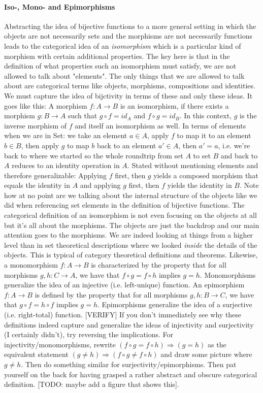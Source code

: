 \paragraph{Iso-, Mono- and Epimorphisms}
Abstracting the idea of bijective functions to a more general setting in which the objects are not necessarily sets and the morphisms are not necessarily functions leads to the categorical idea of an \emph{isomorphism} which is a particular kind of morphism with certain additional properties. The key here is that in the definition of what properties such an isomorphism must satisfy, we are not allowed to talk about "elements". The only things that we are allowed to talk about are categorical terms like objects, morphisms, compositions and identities. We must capture the idea of bijctivity in terms of these and only these ideas. It goes like this: A morphism $f: A \rightarrow B$ is an isomorphism, if there exists a morphism $g: B \rightarrow A$ such that $g \circ f = id_A$ and  $f \circ g = id_B$. In this context, $g$ is the inverse morphism of $f$ and itself an isomorphism as well. In terms of elements when we are in Set: we take an element $a \in A$, apply $f$ to map it to an element $b \in B$, then apply $g$ to map $b$ back to an element $a' \in A$, then $a' = a$, i.e. we're back to where we started so the whole roundtrip from set $A$ to set $B$ and back to $A$ reduces to an identity operation in $A$. Stated without mentioning elements and therefore generalizable: Applying $f$ first, then $g$ yields a composed morphism that equals the identity in $A$ and applying $g$ first, then $f$ yields the identity in $B$. Note how at no point are we talking about the internal structure of the objects like we did when referencing set elements in the definition of bijective functions. The categorical definition of an isomorphism is not even focusing on the objects at all but it's all about the morphisms. The objects are just the backdrop and our main attention goes to the morphisms. We are indeed looking at things from a higher level than in set theoretical descriptions where we looked \emph{inside} the details of the objects. This is typical of category theoretical definitions and theorems. Likewise, a monomorphism $f: A \rightarrow B$ is characterized by the property that for all morphisms $g,h: C \rightarrow A$, we have that $f \circ g = f \circ h$ implies $g = h$. Monomorphisms generalize the idea of an injective (i.e. left-unique) function. An epimorphism $f: A \rightarrow B$ is defined by the property that for all morphisms $g,h: B \rightarrow C$, we have that $g \circ f = h \circ f$ implies $g = h$. Epimorphisms generalize the idea of a surjective (i.e. right-total) function. [VERIFY] If you don't immediately see why these definitions indeed capture and generalize the ideas of injectivity and surjectivity (I certainly didn't), try reversing the implications. For injectivity/monomorphisms, rewrite $(f \circ g = f \circ h) \Rightarrow (g = h)$ as the equivalent statement $(g \neq h) \Rightarrow (f \circ g \neq f \circ h)$ and draw some picture where $g \neq h$. Then do something similar for surjectivity/epimorphisms. Then pat yourself on the back for having grasped a rather abstract and obscure categorical definition. [TODO: maybe add a figure that shows this].


